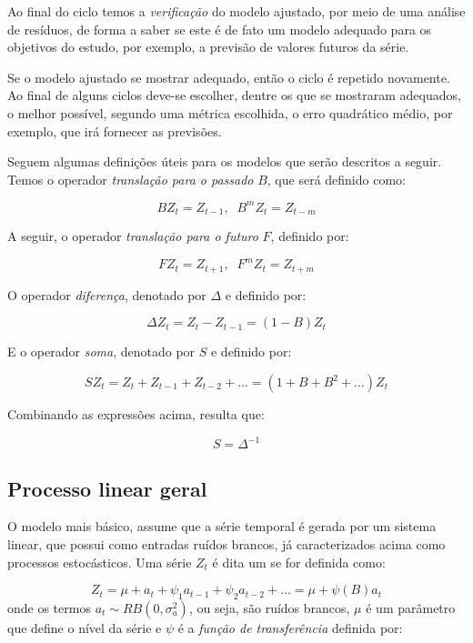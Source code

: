 Ao final do ciclo temos a \emph{verificação} do modelo ajustado, por meio de uma análise de resíduos, de forma a saber se este é de fato um modelo adequado para os objetivos do estudo, por exemplo, a previsão de valores futuros da série.

Se o modelo ajustado se mostrar adequado, então o ciclo é repetido novamente. Ao final de alguns ciclos deve-se escolher, dentre os que se mostraram adequados, o melhor possível, segundo uma métrica escolhida, o erro quadrático médio, por exemplo, que irá fornecer as previsões.

Seguem algumas definições úteis para os modelos que serão descritos a seguir. Temos o operador \emph{translação para o passado} $B$, que será definido como:

\[ B Z_t = Z_{t-1} ,\;\; B^m Z_t = Z_{t-m} \]

A seguir, o operador \emph{translação para o futuro} $F$, definido por:

\[ F Z_t = Z_{t+1} ,\;\; F^m Z_t = Z_{t+m}  \]

O operador \emph{diferença}, denotado por $\Delta$ e definido por:

\begin{equation}\label{series:diferenca} 
\Delta Z_t = Z_t - Z_{t-1} = (1 - B)Z_t 
\end{equation}

E o operador \emph{soma}, denotado por $S$ e definido por:

\[ S Z_t = Z_t + Z_{t-1} + Z_{t-2} + \ldots = (1 + B + B^2 + \ldots)Z_t \]

Combinando as expressões acima, resulta que:

\[ S = \Delta^{-1} \]

\subsection{Processo linear geral}

O modelo mais básico, assume que a série temporal é gerada por um sistema linear, que possui como entradas ruídos brancos, já caracterizados acima como processos estocásticos. Uma série $Z_t$ é dita um  se for definida como:

\begin{equation}\label{series:5.1}
Z_t = \mu + a_t + \psi_1 a_{t-1} + \psi_2 a_{t-2} + \ldots = \mu + \psi(B)a_t
\end{equation}
onde os termos $a_t \sim RB(0, \sigma_a^2)$, ou seja, são ruídos brancos, $\mu$ é um parâmetro que define o nível da série e $\psi$ é a \emph{função de transferência} definida por:

